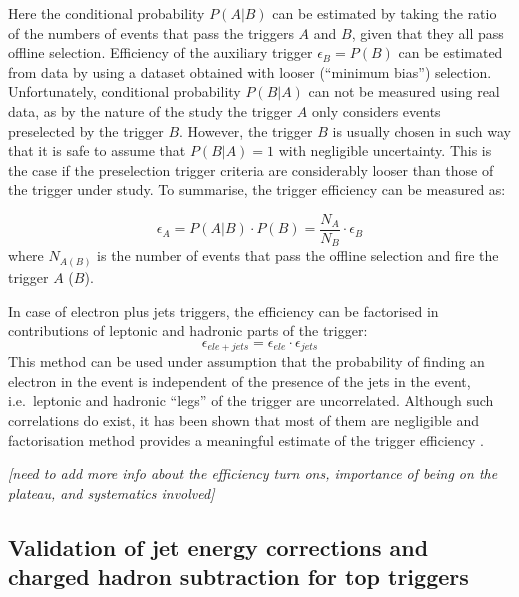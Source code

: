 Here the conditional probability $P(A|B)$ can be estimated by taking the ratio of the numbers of events that pass the
triggers $A$ and $B$, given that they all pass offline selection. Efficiency of the auxiliary trigger $\epsilon_{B} =
P(B)$ can be estimated from data by using a dataset obtained with looser (``minimum bias'') selection. Unfortunately,
conditional probability $P(B|A)$ can not be measured using real data, as by the nature of the study the trigger $A$ only
considers events preselected by the trigger $B$. However, the trigger $B$ is usually chosen in such way that it is safe
to assume that $P(B|A) = 1$ with negligible uncertainty. This is the case if the preselection trigger criteria are
considerably looser than those of the trigger under study. To summarise, the trigger efficiency can be measured as:

\begin{equation}
\epsilon_{A} = P(A|B) \cdot P(B) = \frac{N_A}{N_B} \cdot \epsilon_{B}
\end{equation}
where $N_{A (B)}$ is the number of events that pass the offline selection and fire the trigger $A$ ($B$).


In case of electron plus jets triggers, the efficiency can be factorised in contributions of leptonic and hadronic parts
of the trigger:
\begin{equation}
\epsilon_{ele+jets} = \epsilon_{ele} \cdot \epsilon_{jets}
\end{equation}
This method can be used under assumption that the probability of finding an electron in the event is independent of the
presence of the jets in the event, i.e.\ leptonic and hadronic ``legs'' of the trigger are uncorrelated. Although
such correlations do exist, it has been shown that most of them are negligible and factorisation method provides a
meaningful estimate of the trigger efficiency \cite{d0_note_top_trigger_efficiency}.

\textit{[need to add more info about the efficiency turn ons, importance of being on the plateau, and systematics
involved]}


\subsection{Validation of jet energy corrections and charged hadron subtraction for top triggers}
\label{ss:JEC_PFnoPU_validation}

